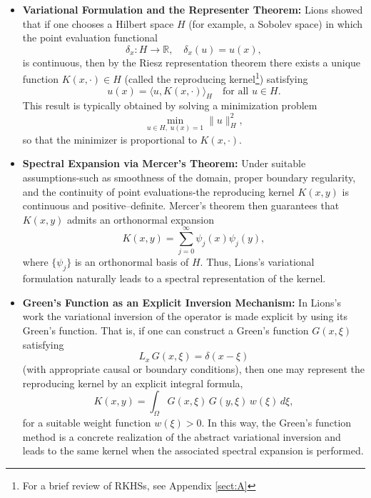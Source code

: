 \documentclass[11pt]{article}
\theoremstyle{plain}
\def\[{\begin{equation}}
\def\]{\end{equation}}
\begin{document}
\begin{itemize}
    \item \textbf{Variational Formulation and the Representer Theorem:}  
        Lions showed that if one chooses a Hilbert space \(H\) (for example, a Sobolev space) in which the point evaluation functional
        \[
        \delta_x: H\to \mathbb{R}, \quad \delta_x(u)=u(x),
        \]
        is continuous, then by the Riesz representation theorem there exists a unique function \(K(x,\cdot)\in H\) (called the reproducing kernel\footnote{For a brief review of RKHSs, see Appendix \ref{sect:A}}) satisfying
        \[
        u(x)=\langle u, K(x,\cdot)\rangle_H \quad \text{for all } u\in H.
        \]
        This result is typically obtained by solving a minimization problem
        \[
        \min_{u\in H,\; u(x)=1} \|u\|_H^2,
        \]
        so that the minimizer is proportional to \(K(x,\cdot)\).

    \item \textbf{Spectral Expansion via Mercer’s Theorem:}  
        Under suitable assumptions-such as smoothness of the domain, proper boundary regularity, and the continuity of point evaluations-the reproducing kernel \(K(x,y)\) is continuous and positive–definite. Mercer’s theorem then guarantees that \(K(x,y)\) admits an orthonormal expansion
        \[
        K(x,y)= \sum_{j=0}^\infty \psi_j(x)\psi_j(y),
        \]
        where \(\{\psi_j\}\) is an orthonormal basis of \(H\). Thus, Lions’s variational formulation naturally leads to a spectral representation of the kernel.

    \item \textbf{Green’s Function as an Explicit Inversion Mechanism:}  
        In Lions’s work the variational inversion of the operator is made explicit by using its Green’s function. That is, if one can construct a Green’s function \(G(x,\xi)\) satisfying
        \[
        L_x\,G(x,\xi)= \delta(x-\xi)
        \]
        (with appropriate causal or boundary conditions), then one may represent the reproducing kernel by an explicit integral formula,
        \[
        K(x,y)= \int_\Omega G(x,\xi) \, G(y,\xi)\, w(\xi)\, d\xi,
        \]
        for a suitable weight function \(w(\xi)>0\). In this way, the Green’s function method is a concrete realization of the abstract variational inversion and leads to the same kernel when the associated spectral expansion is performed.
    

\end{itemize}
\end{document}
